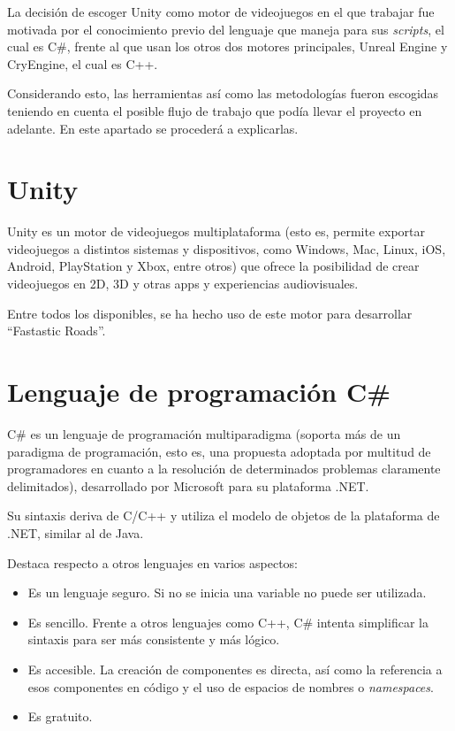  \label{cap:tecnicas}
La decisión de escoger Unity como motor de videojuegos en el que trabajar fue motivada por el conocimiento previo del lenguaje que maneja para sus \textit{scripts}, el cual es C\#, frente al que usan los otros dos motores principales, Unreal Engine y CryEngine, el cual es C++.

Considerando esto, las herramientas así como las metodologías fueron escogidas teniendo en cuenta el posible flujo de trabajo que podía llevar el proyecto en adelante. En este apartado se procederá a explicarlas.

\section{Unity}

Unity es un motor de videojuegos multiplataforma (esto es, permite exportar videojuegos a distintos sistemas y dispositivos, como Windows, Mac, Linux, iOS, Android, PlayStation y Xbox, entre otros) que ofrece la posibilidad de crear videojuegos en 2D, 3D y otras apps y experiencias audiovisuales.

Entre todos los disponibles, se ha hecho uso de este motor para desarrollar ``Fastastic Roads''.

\section{Lenguaje de programación C\#}

C\# es un lenguaje de programación multiparadigma (soporta más de un paradigma de programación, esto es, una propuesta adoptada por multitud de programadores en cuanto a la resolución de determinados problemas claramente delimitados), desarrollado por Microsoft para su plataforma .NET.

Su sintaxis deriva de C/C++ y utiliza el modelo de objetos de la plataforma de .NET, similar al de Java.

Destaca respecto a otros lenguajes en varios aspectos:
\begin{itemize}
\tightlist
    \item Es un lenguaje seguro. Si no se inicia una variable no puede ser utilizada.
    \item Es sencillo. Frente a otros lenguajes como C++, C\# intenta simplificar la sintaxis para ser más consistente y más lógico.
    \item Es accesible. La creación de componentes es directa, así como la referencia a esos componentes en código y el uso de espacios de nombres o \textit{namespaces}.
    \item Es gratuito.
\end{itemize}

